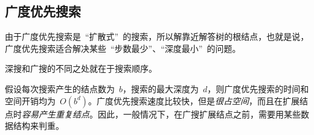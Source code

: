 \subsection{广度优先搜索}
	由于广度优先搜索是~``扩散式''~的搜索，所以解靠近解答树的根结点，也就是说，广度优先搜索适合解决某些~``步数最少''、``深度最小''~的问题。
	
	深搜和广搜的不同之处就在于搜索顺序。
	
	假设每次搜索产生的结点数为~$b$，搜索的最大深度为~$d$，则广度优先搜索的时间和空间开销均为~$O(b^d)$。广度优先搜索速度比较快，但是\emph{很占空间}，而且在扩展结点时\emph{容易产生重复结点}。因此，一般情况下，在广搜扩展结点之前，需要用某些数据结构来判重。
	
	